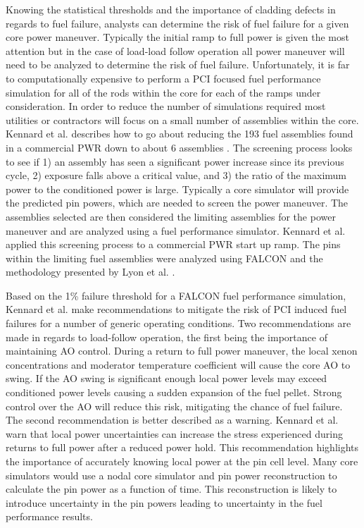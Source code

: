 \documentclass[edeposit,fullpage,11pt]{uiucthesis2009}
\begin{document}
Knowing the statistical thresholds and the importance of cladding defects in regards to fuel failure, analysts can determine the risk of fuel failure for a given core power maneuver.
Typically the initial ramp to full power is given the most attention but in the case of load-load follow operation all power maneuver will need to be analyzed to determine the risk of fuel failure.
Unfortunately, it is far to computationally expensive to perform a \gls{PCI} focused fuel performance simulation for all of the rods within the core for each of the ramps under consideration.
In order to reduce the number of simulations required most utilities or contractors will focus on a small number of assemblies within the core.
Kennard et al. describes how to go about reducing the 193 fuel assemblies found in a commercial \gls{PWR} down to about 6 assemblies \cite{kennard_pci_2016}.
The screening process  looks to see if 1) an assembly has seen a significant power increase since its previous cycle, 2) exposure falls above a critical value, and 3) the ratio of the maximum power to the conditioned power is large.
Typically a core simulator will provide the predicted pin powers, which are needed to screen the power maneuver.
The assemblies selected are then considered the limiting assemblies for the power maneuver and are analyzed using a fuel performance simulator.
Kennard et al. applied this screening process to a commercial \gls{PWR} start up ramp.
The pins within the limiting fuel assemblies were analyzed using FALCON and the methodology presented by Lyon et al. \cite{lyon_pci_2009}.

Based on the 1\% failure threshold for a FALCON fuel performance simulation, Kennard et al. make recommendations to mitigate the risk of \gls{PCI} induced fuel failures for a number of generic operating conditions.
Two recommendations are made in regards to load-follow operation, the first being the importance of maintaining \gls{AO} control.
During a return to full power maneuver, the local xenon concentrations and moderator temperature coefficient will cause the core \gls{AO} to swing.
If the \gls{AO} swing is significant enough local power levels may exceed conditioned power levels causing a sudden expansion of the fuel pellet.
Strong control over the \gls{AO} will reduce this risk, mitigating the chance of fuel failure.
The second recommendation is better described as a warning.
Kennard et al. warn that local power uncertainties can increase the stress experienced during returns to full power after a reduced power hold.
This recommendation highlights the importance of accurately knowing local power at the pin cell level.
Many core simulators would use a nodal core simulator and pin power reconstruction to calculate the pin power as a function of time.
This reconstruction is likely to introduce uncertainty in the pin powers leading to uncertainty in the fuel performance results.
\end{document}
